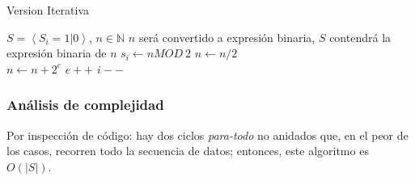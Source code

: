 \documentclass[letter]{article}
\begin{document}
\begin{algorithm}[!htb]
\caption{Version Iterativa}
\begin{algorithmic}[1]
\Require $S=\left< S_i = 1 | 0 \right>$, $n \in \mathbb{N}$
\Ensure $n$ será convertido a expresión binaria, $S$ contendrá la expresión binaria de $n$
    \State$s_i \leftarrow n MOD~2$
    \State$n \leftarrow n/2$
  \EndFor
\EndProcedure\\

      \State$n \leftarrow n+ 2^e$
      \State $e++$
    \EndIf
    \State$i--$
  \EndFor
\EndProcedure
\end{algorithmic}
\end{algorithm}

\subsubsection{Análisis de complejidad} \label{algoritmos:mejorado:complejidad}

Por inspección de código: hay dos ciclos {\it para-todo} no anidados que, en el peor de los casos, recorren todo la secuencia de datos; entonces, este algoritmo es $O(|S|)$.
\end{document}
